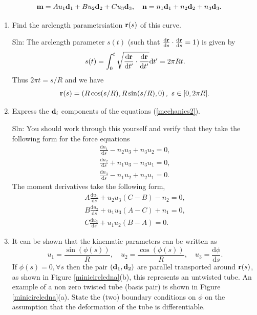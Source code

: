 \documentclass[]{article}
\newcommand{\rmd}{\mathrm{d}}
\newcommand{\deriv}[2]{\frac{\rmd#1}{\rmd #2}}
\begin{document}
\begin{equation}
{\bf m} = A u_1{\bf d}_1 + B u_2{\bf  d}_2 + C u_3{\bf d}_3,\quad {\bf n} = n_1{\bf d}_1 + n_2{\bf d}_2 +  n_3{\bf d}_3.
\end{equation}
\begin{enumerate}[label=(\alph*)]
\item{Find the arclength parametrsiation ${\bf r}(s)$ of this curve.

Sln:
The arclength parameter $s(t)$  (such that $\deriv{{\bf r}}{s}\cdot\deriv{{\bf r}}{s}=1$) is given by
\begin{equation}
s(t) = \int_{0}^{t}\sqrt{\deriv{{\bf r}}{t'}\cdot\deriv{{\bf r}}{t'}}\rmd t' = 2\pi Rt.
\end{equation}
Thus $2\pi t =s/R$ and we have
\begin{equation}
{\bf r}(s) = \left(R\cos(s/R),R\sin(s/R),0\right),\,\,s\in[0,2\pi R].
\end{equation}
}
\item{Express the ${\bf d}_i$ components of the equations (\ref{mechanics2}).

Sln: You should work through this yourself and verify that they take the following form for the force equations
\begin{align}
\label{forceequations}
\deriv{n_1}{s}-n_2u_3 +n_3u_2 =0,\\
\nonumber\deriv{n_2}{s}+n_1u_3 -  n_3 u_1 =0,\\
\nonumber \deriv{n_3}{s}-n_1u_2 + n_2 u_1 =0.
\end{align}
The moment derivatives take the following form,
\begin{align}
\label{momentequations}
A\deriv{u_1}{s}+ u_2u_3(C-B)-n_2 =0,\\
\nonumber B\deriv{u_2}{s}+ u_1u_3(A-C)+n_1 =0,\\
\nonumber C\deriv{u_3}{s}+ u_1u_2(B-A) =0.
\end{align}
}
\item{
It can be shown that the kinematic parameters can be written as
\begin{equation}
u_1 = \frac{\sin(\phi(s))}{R},\quad u_2=\frac{\cos(\phi(s))}{R},\quad u_3 = \deriv{\phi}{s}.
\end{equation}
If $\phi(s)=0,\forall s$ then the pair $({\bf d}_1,{\bf d}_2)$ are parallel transported around  ${\bf r}(s)$, as shown in Figure \ref{minicircledna}(b), this represents an untwisted tube. An example of a non zero twisted tube (basis pair) is shown in Figure \ref{minicircledna}(a). State the (two) boundary conditions on $\phi$ on the assumption that the deformation of the tube is differentiable.

}
\end{enumerate}
\end{document}
